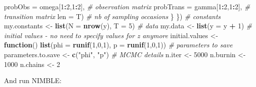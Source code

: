 \documentclass[
  12pt,
]{krantz}
\newenvironment{Shaded}{\begin{snugshade}}{\end{snugshade}}
\newcommand{\AttributeTok}[1]{\textcolor[rgb]{0.13,0.29,0.53}{#1}}
\newcommand{\CommentTok}[1]{\textcolor[rgb]{0.56,0.35,0.01}{\textit{#1}}}
\newcommand{\ControlFlowTok}[1]{\textcolor[rgb]{0.13,0.29,0.53}{\textbf{#1}}}
\newcommand{\DecValTok}[1]{\textcolor[rgb]{0.00,0.00,0.81}{#1}}
\newcommand{\FunctionTok}[1]{\textcolor[rgb]{0.13,0.29,0.53}{\textbf{#1}}}
\newcommand{\NormalTok}[1]{#1}
\newcommand{\OtherTok}[1]{\textcolor[rgb]{0.56,0.35,0.01}{#1}}
\newcommand{\SpecialCharTok}[1]{\textcolor[rgb]{0.81,0.36,0.00}{\textbf{#1}}}
\newcommand{\StringTok}[1]{\textcolor[rgb]{0.31,0.60,0.02}{#1}}
\begin{document}
\begin{Shaded}
\begin{Highlighting}[]
                            \AttributeTok{probObs =}\NormalTok{ omega[}\DecValTok{1}\SpecialCharTok{:}\DecValTok{2}\NormalTok{,}\DecValTok{1}\SpecialCharTok{:}\DecValTok{2}\NormalTok{], }\CommentTok{\# observation matrix}
                            \AttributeTok{probTrans =}\NormalTok{ gamma[}\DecValTok{1}\SpecialCharTok{:}\DecValTok{2}\NormalTok{,}\DecValTok{1}\SpecialCharTok{:}\DecValTok{2}\NormalTok{], }\CommentTok{\# transition matrix}
                            \AttributeTok{len =}\NormalTok{ T) }\CommentTok{\# nb of sampling occasions}
\NormalTok{  \}}
\NormalTok{\})}
\CommentTok{\# constants}
\NormalTok{my.constants }\OtherTok{\textless{}{-}} \FunctionTok{list}\NormalTok{(}\AttributeTok{N =} \FunctionTok{nrow}\NormalTok{(y), }\AttributeTok{T =} \DecValTok{5}\NormalTok{)}
\CommentTok{\# data}
\NormalTok{my.data }\OtherTok{\textless{}{-}} \FunctionTok{list}\NormalTok{(}\AttributeTok{y =}\NormalTok{ y }\SpecialCharTok{+} \DecValTok{1}\NormalTok{)}
\CommentTok{\# initial values {-} no need to specify values for z anymore}
\NormalTok{initial.values }\OtherTok{\textless{}{-}} \ControlFlowTok{function}\NormalTok{() }\FunctionTok{list}\NormalTok{(}\AttributeTok{phi =} \FunctionTok{runif}\NormalTok{(}\DecValTok{1}\NormalTok{,}\DecValTok{0}\NormalTok{,}\DecValTok{1}\NormalTok{),}
                                  \AttributeTok{p =} \FunctionTok{runif}\NormalTok{(}\DecValTok{1}\NormalTok{,}\DecValTok{0}\NormalTok{,}\DecValTok{1}\NormalTok{))}
\CommentTok{\# parameters to save}
\NormalTok{parameters.to.save }\OtherTok{\textless{}{-}} \FunctionTok{c}\NormalTok{(}\StringTok{"phi"}\NormalTok{, }\StringTok{"p"}\NormalTok{)}
\CommentTok{\# MCMC details}
\NormalTok{n.iter }\OtherTok{\textless{}{-}} \DecValTok{5000}
\NormalTok{n.burnin }\OtherTok{\textless{}{-}} \DecValTok{1000}
\NormalTok{n.chains }\OtherTok{\textless{}{-}} \DecValTok{2}
\end{Highlighting}
\end{Shaded}

And run NIMBLE:
\end{document}
